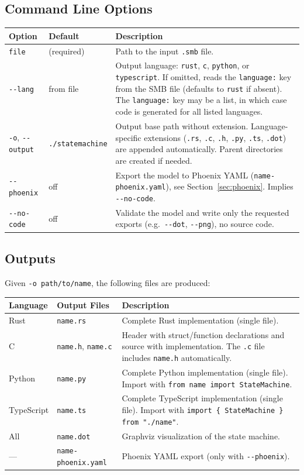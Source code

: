 \documentclass[a4paper,11pt]{article}
\begin{document}
\subsection{Command Line Options}
\begin{longtable}{@{}llp{8cm}@{}}
\toprule
\textbf{Option} & \textbf{Default} & \textbf{Description} \\
\midrule
\endhead
\texttt{file} & (required) & Path to the input \texttt{.smb} file. \\
\texttt{-{}-lang} & from file & Output language: \texttt{rust}, \texttt{c}, \texttt{python}, or \texttt{typescript}. If omitted, reads the \texttt{language:} key from the SMB file (defaults to \texttt{rust} if absent). The \texttt{language:} key may be a list, in which case code is generated for all listed languages. \\
\texttt{-o}, \texttt{-{}-output} & \texttt{./statemachine} & Output base path without extension. Language-specific extensions (\texttt{.rs}, \texttt{.c}, \texttt{.h}, \texttt{.py}, \texttt{.ts}, \texttt{.dot}) are appended automatically. Parent directories are created if needed. \\
\texttt{-{}-phoenix} & off & Export the model to Phoenix YAML (\texttt{name-phoenix.yaml}), see Section~\ref{sec:phoenix}. Implies \texttt{-{}-no-code}. \\
\texttt{-{}-no-code} & off & Validate the model and write only the requested exports (e.g.\ \texttt{-{}-dot}, \texttt{-{}-png}), no source code. \\
\bottomrule
\end{longtable}

\subsection{Outputs}
Given \texttt{-o path/to/name}, the following files are produced:

\begin{longtable}{@{}llp{8cm}@{}}
\toprule
\textbf{Language} & \textbf{Output Files} & \textbf{Description} \\
\midrule
\endhead
Rust & \texttt{name.rs} & Complete Rust implementation (single file). \\
C & \texttt{name.h}, \texttt{name.c} & Header with struct/function declarations and source with implementation. The \texttt{.c} file includes \texttt{name.h} automatically. \\
Python & \texttt{name.py} & Complete Python implementation (single file). Import with \texttt{from name import StateMachine}. \\
TypeScript & \texttt{name.ts} & Complete TypeScript implementation (single file). Import with \texttt{import \{ StateMachine \} from "./name"}. \\
All & \texttt{name.dot} & Graphviz visualization of the state machine. \\
--- & \texttt{name-phoenix.yaml} & Phoenix YAML export (only with \texttt{-{}-phoenix}). \\
\bottomrule
\end{longtable}
\end{document}
